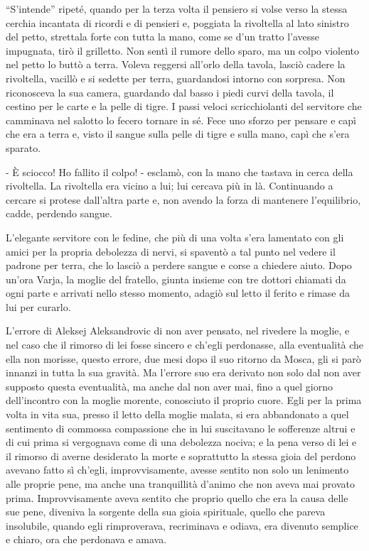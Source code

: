 ``S'intende'' ripeté, quando per la terza volta il pensiero si volse verso la stessa cerchia incantata di ricordi e di pensieri e, poggiata la rivoltella al lato sinistro del petto, strettala forte con tutta la mano, come se d'un tratto l'avesse impugnata, tirò il grilletto. Non sentì il rumore dello sparo, ma un colpo violento nel petto lo buttò a terra. Voleva reggersi all'orlo della tavola, lasciò cadere la rivoltella, vacillò e si sedette per terra, guardandosi intorno con sorpresa. Non riconosceva la sua camera, guardando dal basso i piedi curvi della tavola, il cestino per le carte e la pelle di tigre. I passi veloci scricchiolanti del servitore che camminava nel salotto lo fecero tornare in sé. Fece uno sforzo per pensare e capì che era a terra e, visto il sangue sulla pelle di tigre e sulla mano, capì che s'era sparato. 

- È sciocco! Ho fallito il colpo! - esclamò, con la mano che tastava in cerca della rivoltella. La rivoltella era vicino a lui; lui cercava più in là. Continuando a cercare si protese dall'altra parte e, non avendo la forza di mantenere l'equilibrio, cadde, perdendo sangue. 

L'elegante servitore con le fedine, che più di una volta s'era lamentato con gli amici per la propria debolezza di nervi, si spaventò a tal punto nel vedere il padrone per terra, che lo lasciò a perdere sangue e corse a chiedere aiuto. Dopo un'ora Varja, la moglie del fratello, giunta insieme con tre dottori chiamati da ogni parte e arrivati nello stesso momento, adagiò sul letto il ferito e rimase da lui per curarlo. 

\label{xix-3} 

L'errore di Aleksej Aleksandrovic di non aver pensato, nel rivedere la moglie, e nel caso che il rimorso di lei fosse sincero e ch'egli perdonasse, alla eventualità che ella non morisse, questo errore, due mesi dopo il suo ritorno da Mosca, gli si parò innanzi in tutta la sua gravità. Ma l'errore suo era derivato non solo dal non aver supposto questa eventualità, ma anche dal non aver mai, fino a quel giorno dell'incontro con la moglie morente, conosciuto il proprio cuore. Egli per la prima volta in vita sua, presso il letto della moglie malata, si era abbandonato a quel sentimento di commossa compassione che in lui suscitavano le sofferenze altrui e di cui prima si vergognava come di una debolezza nociva; e la pena verso di lei e il rimorso di averne desiderato la morte e soprattutto la stessa gioia del perdono avevano fatto sì ch'egli, improvvisamente, avesse sentito non solo un lenimento alle proprie pene, ma anche una tranquillità d'animo che non aveva mai provato prima. Improvvisamente aveva sentito che proprio quello che era la causa delle sue pene, diveniva la sorgente della sua gioia spirituale, quello che pareva insolubile, quando egli rimproverava, recriminava e odiava, era divenuto semplice e chiaro, ora che perdonava e amava. 

